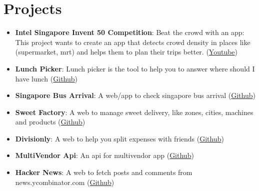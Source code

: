 \documentclass[letterpaper,11pt]{article}
\newcommand{\resumeItem}[2]{
  \item\small{
    \textbf{#1}{: #2 \vspace{-2pt}}
  }
}
\newcommand{\resumeSubItem}[2]{\resumeItem{#1}{#2}\vspace{-4pt}}
\newcommand{\resumeSubHeadingListStart}{\begin{itemize}[leftmargin=*]}
\newcommand{\resumeSubHeadingListEnd}{\end{itemize}}
\begin{document}
\section{Projects}
  \resumeSubHeadingListStart
    \resumeSubItem{Intel Singapore Invent 50 Competition}
      {Beat the crowd with an app: This project wants to create an app that detects crowd density in places like (supermarket, mrt) and helps them to plan their trips better. (\href{https://www.youtube.com/watch?v=0AEbxRXz-tM&ab_channel=HardwareZoneSG}{Youtube})}
    \resumeSubItem{Lunch Picker}
      {Lunch picker is the tool to help you to answer where should I have lunch (\href{https://github.com/yeukfei02}{Github})}
    \resumeSubItem{Singapore Bus Arrival}
      {A web/app to check singapore bus arrival (\href{https://github.com/yeukfei02}{Github})}
    \resumeSubItem{Sweet Factory}
      {A web to manage sweet delivery, like zones, cities, machines and products (\href{https://github.com/yeukfei02}{Github})}
    \resumeSubItem{Divisionly}
      {A web to help you split expenses with friends (\href{https://github.com/yeukfei02}{Github})}
    \resumeSubItem{MultiVendor Api}
      {An api for multivendor app (\href{https://github.com/yeukfei02}{Github})}
    \resumeSubItem{Hacker News}
      {A web to fetch posts and comments from news.ycombinator.com (\href{https://github.com/yeukfei02}{Github})}
  \resumeSubHeadingListEnd


\end{document}

